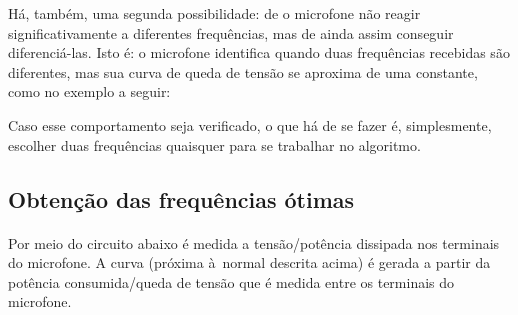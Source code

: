 \documentclass[10pt,a4paper]{report}
\begin{document}
	
	\begin{center}
	\end{center}


Há, também, uma segunda possibilidade: de o microfone não reagir significativamente a diferentes frequências, mas de ainda assim conseguir diferenciá-las. Isto é: o microfone identifica quando duas frequências recebidas são diferentes, mas sua curva de queda de tensão se aproxima de uma constante, como no exemplo a seguir:


\begin{center}
\end{center}


	Caso esse comportamento seja verificado, o que há de se fazer é, simplesmente, escolher duas frequências quaisquer para se trabalhar no algoritmo.

\subsection{Obtenção das frequências ótimas}
\paragraph{}
Por meio do circuito abaixo é medida a tensão/potência dissipada nos terminais do microfone. A curva (próxima à normal descrita acima) é gerada a partir da potência consumida/queda de tensão que é medida entre os terminais do microfone.
\end{document}
